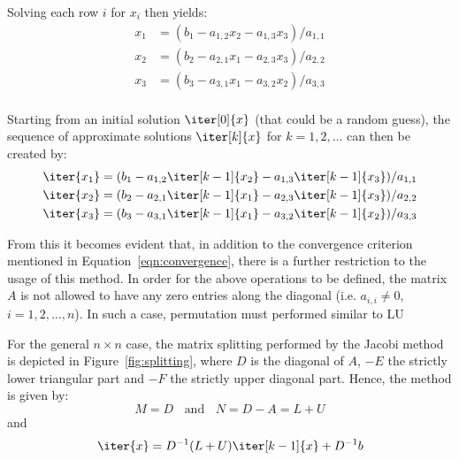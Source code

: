\noindent Solving each row $i$ for $x_i$ then yields:
\begin{equation}
   \begin{aligned}
    x_1 & =  (b_1 -a_{1,2}x_2 - a_{1,3}x_3)/a_{1,1} \\
    x_2 & =  (b_2 -a_{2,1}x_1 - a_{2,3}x_3)/a_{2,2} \\
    x_3 & =  (b_3 -a_{3,1}x_1 - a_{3,2}x_2)/a_{3,3} \\
\end{aligned} 
\end{equation}

\noindent Starting from an initial solution $\iter[0]{x}$ (that could be a random guess), the sequence of approximate solutions $\iter[k]{x}$ for $k = 1,2, \dots$ can then be created by:
\begin{equation}
\label{eqn:jacobi_3x3}
   \begin{aligned}
    \iter{x_1} & =  (b_1 -a_{1,2}\iter[k-1]{x_2} - a_{1,3}\iter[k-1]{x_3})/a_{1,1} \\
    \iter{x_2} & =  (b_2 -a_{2,1}\iter[k-1]{x_1} - a_{2,3}\iter[k-1]{x_3})/a_{2,2} \\
    \iter{x_3} & =  (b_3 -a_{3,1}\iter[k-1]{x_1} - a_{3,2}\iter[k-1]{x_2})/a_{3,3} \\
\end{aligned} 
\end{equation}

\noindent From this it becomes evident that, in addition to the convergence criterion mentioned in Equation~\hyperref[eqn:convergence]{\ref{eqn:convergence}}, there is a further restriction to the usage of this method. In order for the above operations to be defined, the matrix $A$ is not allowed to have any zero entries along the diagonal (i.e. $a_{i,i} \neq 0$, $i=1,2,\dots, n$). In such a case, permutation must performed similar to LU %

For the general $n \times n$ case, the matrix splitting performed by the Jacobi method is depicted in Figure~\hyperref[fig:splitting]{\ref{fig:splitting}}, where $D$ is the diagonal of $A$, $-E$ the strictly lower triangular part and $-F$ the strictly upper diagonal part. Hence, the method is given by:
\begin{equation}
    M=D \;\;\text{ and } \;\; N=D-A=L+U
\end{equation}
\noindent and
\begin{equation}
    \iter{x} = D^{-1}(L+U)\iter[k-1]{x} +D^{-1}b
\end{equation}

